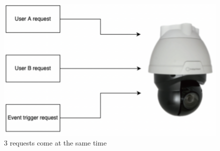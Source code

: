 \begin{figure}[H]
    \centering
    \includegraphics[width=\textwidth]{figsrc/preemptive-example.png}
    \caption{3 requests come at the same time \label{fig:preemptive-example}}
\end{figure}



